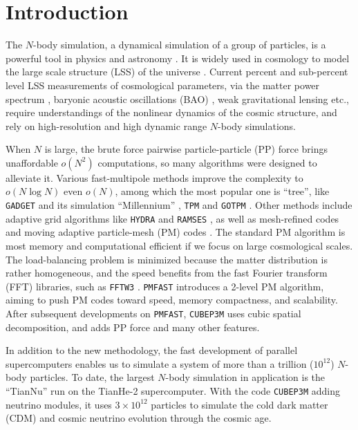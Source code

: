 \documentclass[10pt,twocolumn,reprint]{emulateapj}
\begin{document}
\section{Introduction}\label{s.intro}
The $N$-body simulation, a dynamical simulation of a group of particles, is a powerful tool in physics and astronomy \citep{1988csup.book.....H}. It is widely used in cosmology to model the large scale structure (LSS) of the universe \citep{1985ApJ...292..371D}. Current percent and sub-percent level LSS measurements of cosmological parameters, via the matter power spectrum \citep{2005MNRAS.360L..82R,2011ApJ...726....7T}, baryonic acoustic oscillations (BAO) \citep{2005ApJ...633..560E,2009ApJ...700..479T}, weak gravitational lensing \citep{2003ApJ...592..699V,2009A&A...499...31H,2009ApJ...701..945S} etc., require understandings of the nonlinear dynamics of the cosmic structure, and rely on high-resolution and high dynamic range $N$-body simulations.

When $N$ is large, the brute force pairwise particle-particle (PP) force brings unaffordable $o(N^2)$ computations, so many algorithms were designed to alleviate it. Various fast-multipole methods \citep{1985JCoPh..60..187R,2014ComAC...1....1D,2016ascl.soft09016P} improve the complexity to $o(N\log N)$ even $o(N)$, among which the most popular one is ``tree'', like {\tt GADGET} \citep{2001NewA....6...79S,2005MNRAS.364.1105S} and its simulation ``Millennium'' \citep{2005Natur.435..629S,2012MNRAS.426.2046A}, {\tt TPM} \citep{1995ApJS...98..355X} and {\tt GOTPM} \citep{2004NewA....9..111D}. Other methods include adaptive grid algorithms like {\tt HYDRA} \citep{1995ApJ...452..797C} and {\tt RAMSES} \citep{2010ascl.soft11007T}, as well as mesh-refined codes \citep{1991ApJ...368L..23C} and moving adaptive particle-mesh (PM) codes \citep{1995ApJS..100..269P}. The standard PM algorithm \citep{1988csup.book.....H} is most memory and computational efficient if we focus on large cosmological scales. The load-balancing problem is minimized because the matter distribution is rather homogeneous, and the speed benefits from the fast Fourier transform (FFT) libraries, such as {\tt FFTW3} \citep{Frigo05thedesign}. {\tt PMFAST} \citep{2005NewA...10..393M} introduces a 2-level PM algorithm, aiming to push PM codes toward speed, memory compactness, and scalability. After subsequent developments on {\tt PMFAST}, {\tt CUBEP3M} \citep{2013MNRAS.436..540H} uses cubic spatial decomposition, and adds PP force and many other features.

In addition to the new methodology, the fast development of parallel supercomputers enables us to simulate a system of more than a trillion ($10^{12}$) $N$-body particles. To date, the largest $N$-body simulation in application is the ``TianNu'' \citep{2017NatAs...1E.143Y,2017RAA....17...85E} run on the TianHe-2 supercomputer. With the code {\tt CUBEP3M} adding neutrino modules, it uses $3\times 10^{12}$ particles to simulate the cold dark matter (CDM) and cosmic neutrino evolution through the cosmic age.
\end{document}
